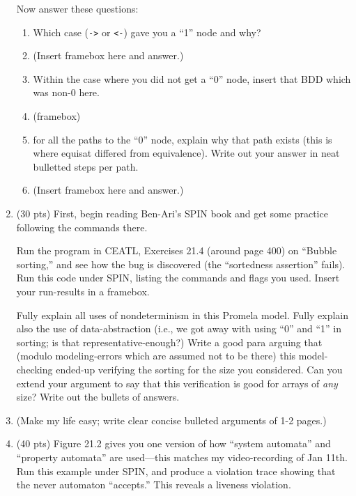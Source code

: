 \documentclass[11pt]{article}
\begin{document}
\begin{enumerate}
  Now answer these questions:
  
  \begin{enumerate}
  \item Which case (\verb|->| or \verb|<-|) gave you a ``1'' node and why?

  \item[] (Insert framebox here and answer.)

  \item Within the case
    where you did not get a ``0'' node,
    insert that BDD which was non-0 here.
  \item[] (framebox)
  \item
    for all the paths to the ``0'' node,
    explain why that path exists (this is where equisat differed from equivalence).
    Write out your answer in neat bulletted steps per path.
  \item[] (Insert framebox here and answer.)
  \end{enumerate}

  \clearpage
  
 
\item (30 pts) First, begin reading Ben-Ari's SPIN book and get some practice
  following the commands there.

  Run the program in CEATL, Exercises
  21.4 (around page 400) on ``Bubble sorting,'' and see how the bug is discovered
  (the ``sortedness assertion'' fails).
  Run this code under SPIN, listing the commands and flags you used.
  Insert your run-results in a framebox.
  
  Fully explain all uses of nondeterminism in this Promela model.
  Fully explain also the use of data-abstraction (i.e., we got away with
  using ``0'' and ``1'' in sorting; is that representative-enough?)
  Write a good para arguing that (modulo modeling-errors which are assumed
  not to be there) this model-checking ended-up verifying the sorting for the size
  you considered.
  Can you extend your argument to say that this verification is good for
  arrays of {\em any} size? Write out the bullets of answers.
  
  \item[] (Make my life easy; write clear concise bulleted arguments of 1-2 pages.)

    \clearpage
  
  \item (40 pts) Figure 21.2 gives you one version of how ``system automata''
    and ``property automata'' are used---this matches my video-recording
    of Jan 11th.
    Run this example under SPIN, and produce a violation trace showing that
    the never automaton ``accepts.'' This reveals a liveness violation.
\end{enumerate}
\end{document}
